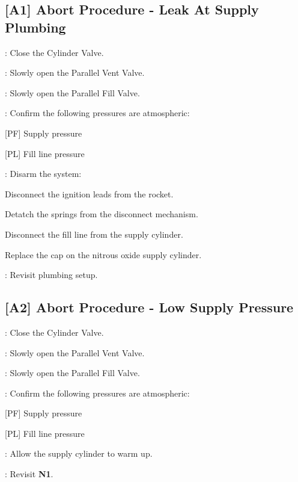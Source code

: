 \begin{checklist}
\subsection{[A1] Abort Procedure - Leak At Supply Plumbing}
\begin{checklist}
    \item \primary{}: Close the Cylinder Valve.
    \item \primary{}: Slowly open the Parallel Vent Valve.
    \item \primary{}: Slowly open the Parallel Fill Valve.
    \item \control{}: Confirm the following pressures are atmospheric:
    \begin{checklist}
        \item {[PF]} Supply pressure
        \item {[PL]} Fill line pressure
    \end{checklist}
    \item \primary{}: Disarm the system:
        \begin{checklist}    
            \item Disconnect the ignition leads from the rocket.
            \item Detatch the springs from the disconnect mechanism.
            \item Disconnect the fill line from the supply cylinder.
            \item Replace the cap on the nitrous oxide supply cylinder.
        \end{checklist}
    \item \ops{}: Revisit plumbing setup.
\end{checklist}
\setcounter{checklistnum}{0}

\subsection{[A2] Abort Procedure - Low Supply Pressure}
\begin{checklist}
    \item \primary{}: Close the Cylinder Valve.
    \item \primary{}: Slowly open the Parallel Vent Valve.
    \item \primary{}: Slowly open the Parallel Fill Valve.
    \item \control{}: Confirm the following pressures are atmospheric:
    \begin{checklist}
        \item {[PF]} Supply pressure
        \item {[PL]} Fill line pressure
    \end{checklist}
    \item \primary{}: Allow the supply cylinder to warm up.
    \item \ops{}: Revisit \textbf{N1}.
\end{checklist}
\setcounter{checklistnum}{0}


\end{checklist}
